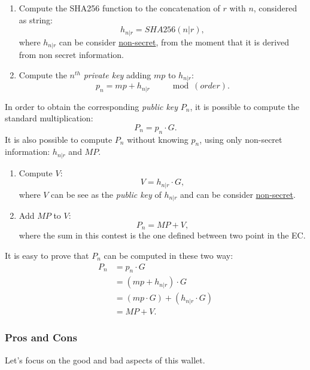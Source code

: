 \begin{enumerate}[label=(\roman*)]
	\item Compute the SHA256 function to the concatenation of $r$ with $n$, considered as string:
	\begin{equation*}
	h_{n|r}=SHA256 (n|r),
	\end{equation*}
	where $h_{n|r}$ can be consider \underline{non-secret}, from the moment that it is derived from non secret information.
	\item Compute the $n^{th}$ \textit{private key} adding $mp$ to $h_{n|r}$:
	\begin{equation*}
	p_n=mp+h_{n|r} \qquad \mod (order).
	\end{equation*}
\end{enumerate}
In order to obtain the corresponding \textit{public key} $P_n$, it is possible to compute the standard multiplication:
\begin{equation*}
P_n=p_n \cdot G.
\end{equation*}
It is also possible to compute $P_n$ without knowing $p_n$, using only non-secret information: $h_{n|r}$ and $MP$.
\begin{enumerate}[label=(\roman*)]
	\item Compute $V$:
	\begin{equation*}
	V=h_{n|r} \cdot G,
	\end{equation*}
	where $V$ can be see as the \textit{public key} of $h_{n|r}$ and can be consider \underline{non-secret}.
	\item Add $MP$ to $V$:
	\begin{equation*}
	P_n=MP+V,
	\end{equation*}
	where the sum in this contest is the one defined between two point in the EC.
\end{enumerate}
It is easy to prove that $P_n$ can be computed in these two way:
\begin{equation*} \label{eq1}
\begin{split}
P_n & = p_n \cdot G \\
& = (mp+h_{n|r}) \cdot G \\
& = (mp \cdot G) + (h_{n|r}\cdot G) \\
& = MP + V.
\end{split}
\end{equation*}

\subsubsection{Pros and Cons}
Let's focus on the good and bad aspects of this wallet.

